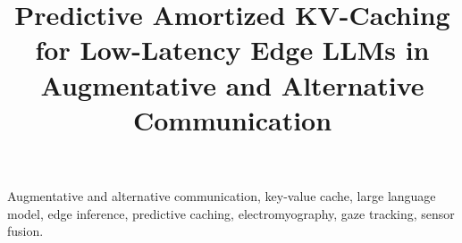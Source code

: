 \documentclass[journal]{IEEEtran}
\begin{document}
\title{Predictive Amortized KV-Caching for Low-Latency Edge LLMs in Augmentative and Alternative Communication}

\author{%
}

\maketitle



\begin{IEEEkeywords}
Augmentative and alternative communication, key-value cache, large language model, edge inference, predictive caching, electromyography, gaze tracking, sensor fusion.
\end{IEEEkeywords}











\end{document}
